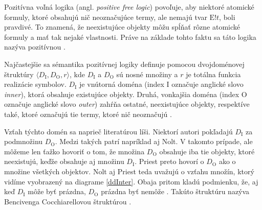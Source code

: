 \documentclass[12pt, letterpaper]{article}
\begin{document}
Pozitívna voľná logika (angl. \textit{positive free logic}) povoľuje, aby niektoré atomické formuly, ktoré obsahujú nič neoznačujúce termy, ale nemajú tvar $\text{E}!t$, boli pravdivé. To znamená, že neexistujúce objekty môžu spĺňať rôzne atomické formuly a mať tak nejaké vlastnosti. Práve na základe tohto faktu sa táto logika nazýva pozitívnou \parencites[]{sep-logic-free}[293]{Priest_2008}.\par
Najčastejšie sa sémantika pozitívnej logiky definuje pomocou dvojdoménovej štruktúry $\langle D_{\text{I}}, D_{\text{O}}, r\rangle$, kde $D_{\text{I}}$ a $D_{\text{O}}$ sú nosné množiny a $r$ je totálna funkcia realizácie symbolov. $D_{\text{I}}$ je vnútorná doména (index I označuje anglické slovo \textit{inner}), ktorá obsahuje existujúce objekty. Druhá, vonkajšia doména (index O označuje anglické slovo \textit{outer}) zahŕňa ostatné, neexistujúce objekty, respektíve také, ktoré označujú tie termy, ktoré nič neoznačujú \parencites[278]{Antonelli}[157]{Dumitru2015}[82]{LambertHierarchy}[270]{Lambert2017}[186]{Leeb}[221]{Lehmann2002}{sep-logic-free}[290]{Priest_2008}.\par
Vzťah týchto domén sa naprieč literatúrou líši. Niektorí autori pokľadajú $D_{\text{I}}$ za podmnožinu $D_{\text{O}}$. Medzi takých patrí napríklad aj Nolt. V takomto prípade, ale môžeme len ťažko hovoriť o tom, že množina $D_{\text{O}}$ obsahuje iba tie objekty, ktoré neexistujú, keďže obsahuje aj množinu $D_{\text{I}}$. Priest preto hovorí o $D_{\text{O}}$ ako o množine všetkých objektov. Nolt aj Priest teda uvažujú o vzťahu množín, ktorý vidíme vyobrazený na diagrame \ref{ddInter}. Obaja pritom kladú podmienku, že, aj keď $D_{\text{I}}$ môže byť prázdna, $D_{\text{O}}$ prázdna byť nemôže \parencites{sep-logic-free}[290]{Priest_2008}. Takúto štruktúru nazýva Bencivenga Cocchiarellovou štruktúrou \parencites[164]{Bencivenga2002}.\par
\end{document}
